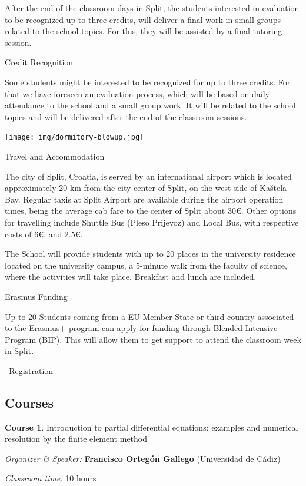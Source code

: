 \documentclass[
]{article}
\begin{document}
After the end of the classroom days in Split, the students interested in
evaluation to be recognized up to three credits, will deliver a final
work in small groups related to the school topics. For this, they will
be assisted by a final tutoring session.

Credit Recognition

Some students might be interested to be recognized for up to three
credits. For that we have foreseen an evaluation process, which will be
based on daily attendance to the school and a small group work. It will
be related to the school topics and will be delivered after the end of
the classroom sessions.

\texttt{[image: img/dormitory-blowup.jpg]}

Travel and Accommodation

The city of Split, Croatia, is served by an international airport which
is located approximately 20 km from the city center of Split, on the
west side of Kaštela Bay. Regular taxis at Split Airport are available
during the airport operation times, being the average cab fare to the
center of Split about 30€. Other options for travelling include Shuttle
Bus (Pleso Prijevoz) and Local Bus, with respective costs of 6€. and
2.5€.

The School will provide students with up to 20 places in the university
residence located on the university campus, a 5-minute walk from the
faculty of science, where the activities will take place. Breakfast and
lunch are included.

Erasmus Funding

Up to 20 Students coming from a EU Member State or third country
associated to the Erasmus+ program can apply for funding through Blended
Intensive Program (BIP). This will allow them to get support to attend
the classroom week in Split.

\protect\hyperlink{work}{\emph{~}Registration}

\hypertarget{courses}{%
\subsection{Courses}\label{courses}}

\textbf{Course 1}. Introduction to partial differential equations:
examples and numerical resolution by the finite element method

\emph{Organizer \& Speaker:} \textbf{Francisco Ortegón Gallego}
(Universidad de Cádiz)

\emph{Classroom time:} \textbf{} 10 hours
\end{document}
